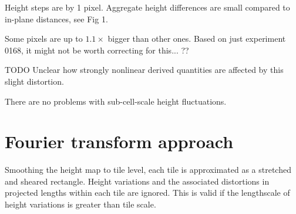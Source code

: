 \documentclass[10pt,a4paper]{article}
\begin{document}
Height steps are by 1 pixel.  Aggregate height differences are small compared to in-plane distances, see Fig 1.

Some pixels are up to $1.1 \times$ bigger than other ones.  Based on just experiment 0168, it might not be worth correcting for this... ??  

TODO Unclear how strongly nonlinear derived quantities are affected by this slight distortion.

There are no problems with sub-cell-scale height fluctuations.

\section{Fourier transform approach}
Smoothing the height map to tile level, each tile is approximated as a stretched and sheared rectangle.  Height variations and the associated distortions in projected lengths within each tile are ignored.  This is valid if the lengthscale of height variations is greater than tile scale.  
\end{document}
